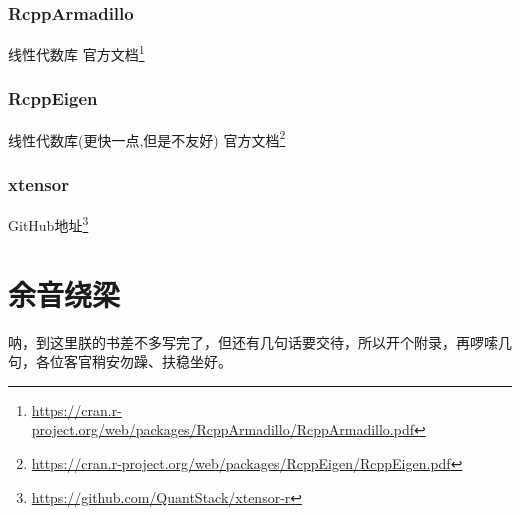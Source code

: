 \documentclass[]{ctexbook}
\renewcommand{\href}[2]{#2\footnote{\url{#1}}}
\begin{document}
\hypertarget{rcpparmadillo}{%
\subsection{RcppArmadillo}\label{rcpparmadillo}}

线性代数库
\href{https://cran.r-project.org/web/packages/RcppArmadillo/RcppArmadillo.pdf}{官方文档}

\hypertarget{rcppeigen}{%
\subsection{RcppEigen}\label{rcppeigen}}

线性代数库(更快一点,但是不友好)
\href{https://cran.r-project.org/web/packages/RcppEigen/RcppEigen.pdf}{官方文档}

\hypertarget{xtensor}{%
\subsection{xtensor}\label{xtensor}}

\href{https://github.com/QuantStack/xtensor-r}{GitHub地址}

\cleardoublepage

\hypertarget{appendix-}{%
\appendix {}}


\hypertarget{sound}{%
\chapter{余音绕梁}\label{sound}}

呐，到这里朕的书差不多写完了，但还有几句话要交待，所以开个附录，再啰嗦几句，各位客官稍安勿躁、扶稳坐好。



\backmatter
\printindex
\end{document}
